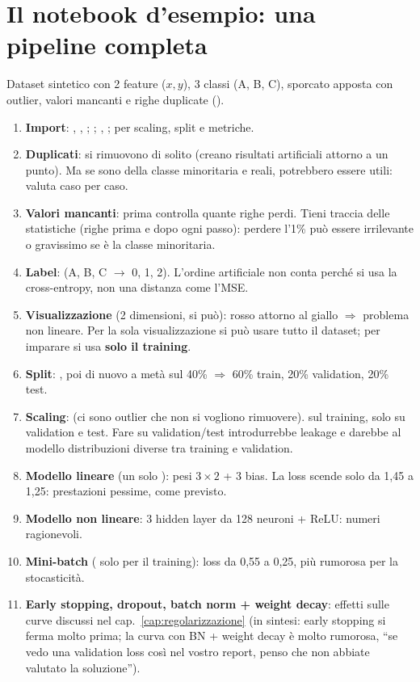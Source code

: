\section{Il notebook d'esempio: una pipeline completa}
Dataset sintetico con 2 feature ($x, y$), 3 classi (A, B, C), sporcato apposta con outlier, valori mancanti e righe duplicate
().
\begin{enumerate}
  \item \textbf{Import}: , , ; ; , ;
         per scaling, split e metriche.
  \item \textbf{Duplicati}: si rimuovono di solito (creano risultati artificiali attorno a un punto). Ma se sono della classe
        minoritaria e reali, potrebbero essere utili: valuta caso per caso.
  \item \textbf{Valori mancanti}: prima controlla quante righe perdi. Tieni traccia delle statistiche (righe prima e dopo ogni passo):
        perdere l'1\% può essere irrilevante o gravissimo se è la classe minoritaria.
  \item \textbf{Label}:  (A, B, C $\to$ 0, 1, 2). L'ordine artificiale non conta perché si usa la cross-entropy, non
        una distanza come l'MSE.
  \item \textbf{Visualizzazione} (2 dimensioni, si può): rosso attorno al giallo $\Rightarrow$ problema non lineare.
        Per la sola visualizzazione si può usare tutto il dataset; per imparare si usa \textbf{solo il training}.
  \item \textbf{Split}: , poi di nuovo a metà sul 40\% $\Rightarrow$
        60\% train, 20\% validation, 20\% test.
  \item \textbf{Scaling}:  (ci sono outlier che non si vogliono rimuovere).  sul training,
        solo  su validation e test. Fare  su validation/test introdurrebbe leakage e darebbe al modello
        distribuzioni diverse tra training e validation.
  \item \textbf{Modello lineare} (un solo ): pesi $3\times 2$ + 3 bias. La loss scende solo da 1,45 a 1,25:
        prestazioni pessime, come previsto.
  \item \textbf{Modello non lineare}: 3 hidden layer da 128 neuroni + ReLU: numeri ragionevoli.
  \item \textbf{Mini-batch} ( solo per il training): loss da 0,55 a 0,25, più rumorosa per la stocasticità.
  \item \textbf{Early stopping, dropout, batch norm + weight decay}: effetti sulle curve discussi nel cap.~\ref{cap:regolarizzazione}
        (in sintesi: early stopping si ferma molto prima; la curva con BN + weight decay è molto rumorosa, ``se vedo una validation
        loss così nel vostro report, penso che non abbiate valutato la soluzione'').
\end{enumerate}
